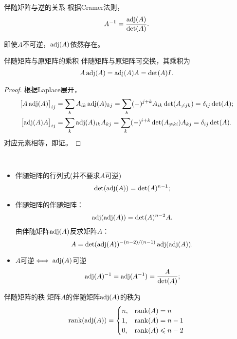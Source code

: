 \begin{theorem}
	{伴随矩阵与逆的关系}{}
	根据Cramer法则，
	\begin{align}
		A^{-1}=\frac{\operatorname{adj}(A)}{\det(A)}.
	\end{align}
\end{theorem}
\begin{remark}
	即使$A$不可逆，$\operatorname{adj}(A)$依然存在。
\end{remark}
\begin{theorem}{伴随矩阵与原矩阵的乘积}{}
	伴随矩阵与原矩阵可交换，其乘积为
	\begin{align}
		A\operatorname{adj}(A)=\operatorname{adj}(A)A=\det(A)I.
	\end{align}
\end{theorem}
\begin{proof}
	根据Laplace展开，
	\begin{align*}
		\bigfkh{A\adj(A)}_{ij}&=\sum_{k}A_{ik}\adj(A)_{kj}=\sum_{k}(-)^{j+k}A_{ik}\det(A_{\neq jk})=\vd_{ij}\det(A);\\
		\bigfkh{\adj(A)A}_{ij}&=\sum_{k}\adj(A)_{ik}A_{kj}=\sum_{k}(-)^{i+k}\det(A_{\neq ki})A_{kj}=\vd_{ij}\det(A).%
	\end{align*}
	对应元素相等，即证。
\end{proof}
\begin{corollary}
	~
	\begin{itemize}
		\item %
		伴随矩阵的行列式(并不要求$A$可逆)
		\begin{align}
			\det(\operatorname{adj}(A))=\det(A)^{n-1};
		\end{align}
		\item 伴随矩阵的伴随矩阵：
		\begin{align}
			\operatorname{adj}(\operatorname{adj}(A))=\det(A)^{n-2}A.
		\end{align}
		由伴随矩阵$\operatorname{adj}(A)$反求矩阵$A$：
		\[
			A=\det(\operatorname{adj}(A))^{-(n-2)/(n-1)}\operatorname{adj}(\operatorname{adj}(A)).
		\]
		\item $A$可逆$\iff\operatorname{adj}(A)$可逆
		\begin{align}
			\operatorname{adj}(A)^{-1}=\operatorname{adj}(A^{-1})=\frac{A}{\det(A)};
		\end{align}
	\end{itemize}
\end{corollary}

\begin{theorem}
	{伴随矩阵的秩}{}
	矩阵$A$的伴随矩阵$\operatorname{adj}(A)$的秩为
	\begin{equation}
		\operatorname{rank}(\operatorname{adj}(A))=\begin{cases}
			n,&\operatorname{rank}(A)=n\\
			1,&\operatorname{rank}(A)=n-1\\
			0,&\operatorname{rank}(A)\leqslant n-2\\
		\end{cases}
	\end{equation}
\end{theorem}

